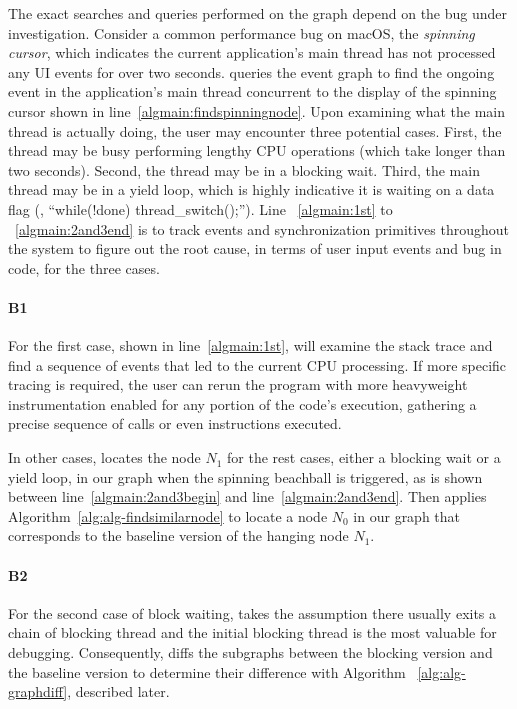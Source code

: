 The exact searches and queries performed on the graph depend on the bug under
investigation. Consider a common performance bug on macOS, the \emph{spinning
cursor}, which indicates the current application's main thread has not processed
any UI events for over two seconds. \xxx queries the event graph to find the
ongoing event in the application's main thread concurrent to the display of
the spinning cursor shown in line~\ref{algmain:findspinningnode}. Upon examining
what the main thread is actually doing, the user may encounter three potential
cases. First, the thread may be busy performing lengthy CPU operations (which
take longer than two seconds). Second, the thread may be in a blocking wait.
Third, the main thread may be in a yield loop, which is highly indicative
it is waiting on a data flag (\eg, ``while(!done) thread\_switch();'').
Line ~\ref{algmain:1st} to ~\ref{algmain:2and3end} is to track events and
synchronization primitives throughout the system to figure out the root cause,
in terms of user input events and bug in code, for the three cases.

\paragraph{B1}

For the first case, shown in line~\ref{algmain:1st}, \xxx will examine
the stack trace and find a sequence of events that led to the current CPU
processing. If more specific tracing is required, the user can rerun the
program with more heavyweight instrumentation enabled for any portion of the
code's execution, gathering a precise sequence of calls or even instructions
executed.

In other cases, \xxx locates the node $N_1$ for the rest
cases, either a blocking wait or a yield loop, in our graph
when the spinning beachball is triggered, as is shown between
line~\ref{algmain:2and3begin} and line~\ref{algmain:2and3end}. Then \xxx applies
Algorithm~\ref{alg:alg-findsimilarnode} to locate a node $N_0$ in our graph that
corresponds to the baseline version of the hanging node $N_1$.

\paragraph{B2}

For the second case of block waiting, \xxx takes the assumption there usually
exits a chain of blocking thread and the initial blocking thread is the most
valuable for debugging. Consequently, \xxx diffs the subgraphs between the
blocking version and the baseline version to determine their difference with
Algorithm ~\ref{alg:alg-graphdiff}, described later.

